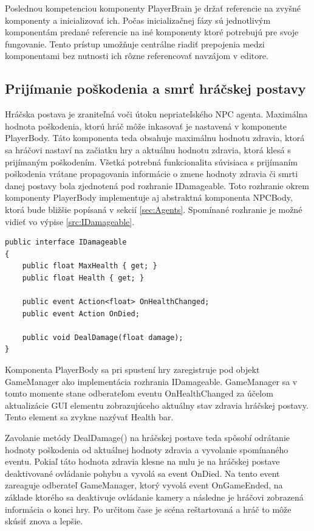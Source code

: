 \documentclass[slovak, master]{diploma}
\begin{document}
Poslednou kompetenciou komponenty PlayerBrain je držať referencie na zvyšné komponenty a inicializovať ich. Počas inicializačnej fázy sú jednotlivým komponentám predané referencie na iné komponenty ktoré potrebujú pre svoje fungovanie. Tento prístup umožňuje centrálne riadiť prepojenia medzi komponentami bez nutnosti ich rôzne referencovať navzájom v editore.

\subsection{Prijímanie poškodenia a smrť hráčskej postavy}
\label{sec:DealingDamage}
Hráčska postava je zraniteľná voči útoku nepriateľského NPC agenta. Maximálna hodnota poškodenia, ktorú hráč môže inkasovať je nastavená v komponente PlayerBody. Táto komponenta teda obsahuje maximálnu hodnotu zdravia, ktorá sa hráčovi nastaví na začiatku hry a aktuálnu hodnotu zdravia, ktorá klesá s prijímaným poškodením. Všetká potrebná funkcionalita súvisiaca s prijímaním poškodenia vrátane propagovania informácie o zmene hodnoty zdravia či smrti danej postavy bola zjednotená pod rozhranie IDamageable. Toto rozhranie okrem komponenty PlayerBody implementuje aj abstraktná komponenta NPCBody, ktorá bude bližšie popísaná v sekcií \ref{sec:Agents}. Spomínané rozhranie je možné vidieť vo výpise \ref{src:IDamageable}. 

\vspace{8pt}
\begin{lstlisting}[label=src:IDamageable,caption={Rohranie IDamageable}]
public interface IDamageable
{
    public float MaxHealth { get; }
    public float Health { get; }

    public event Action<float> OnHealthChanged;
    public event Action OnDied;

    public void DealDamage(float damage);
}
\end{lstlisting}

Komponenta PlayerBody sa pri spustení hry zaregistruje pod objekt GameManager ako implementácia rozhrania IDamageable. GameManager sa v tomto momente stane odberateľom eventu OnHealthChanged za účelom aktualizácie GUI elementu zobrazujúceho aktuálny stav zdravia hráčskej postavy. Tento element sa zvykne nazývať Health bar.

Zavolanie metódy DealDamage() na hráčskej postave teda spôsobí odrátanie hodnoty poškodenia od aktuálnej hodnoty zdravia a vyvolanie spomínaného eventu. Pokiaľ táto hodnota zdravia klesne na nulu je na hráčskej postave deaktivované ovládanie pohybu a vyvolá sa event OnDied. Na tento event zareaguje odberateľ GameManager, ktorý vyvolá event OnGameEnded, na základe ktorého sa deaktivuje ovládanie kamery a následne je hráčovi zobrazená informácia o konci hry. Po určitom čase je scéna reštartovaná a hráč to môže skúsiť znova a lepšie. 
\end{document}
